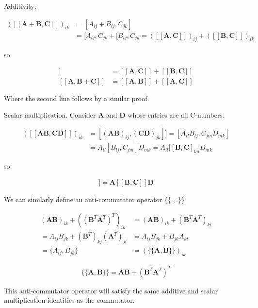 \documentclass[12pt]{article}
\newcommand{\bv}[1]{\boldsymbol{#1}}
\begin{document}
Additivity:

\begin{align}
([[\bv{A}+\bv{B},\bv{C}]])_{ik} &= [A_{ij}+B_{ij},C_{jk}]\\
&= [A_{ij},C_{jk}+[B_{ij},C_{jk} = ([[\bv{A},\bv{C}]])_{ij} + ([[\bv{B},\bv{C}]])_{ik}
\end{align}

so

\begin{align}
[[\bv{A}+\bv{B},\bv{C}]] &= [[\bv{A},\bv{C}]]+[[\bv{B},\bv{C}]]\\
[[\bv{A},\bv{B}+\bv{C}]] &= [[\bv{A},\bv{B}]] + [[\bv{A},\bv{C}]]
\end{align}

Where the second line follows by a similar proof.

Scalar multiplication. Consider $\bv{A}$ and $\bv{D}$ whose entries are all C-numbers.

\begin{align}
([[\bv{A}\bv{B},\bv{C}\bv{D}]])_{ik} &= [(\bv{A}\bv{B})_{ij},(\bv{C}\bv{D})_{jk}]] = [A_{il}B_{lj},C_{jm}D_{mk}]\\
&= A_{il}[B_{lj},C_{jm}]D_{mk}= A_{il}[[\bv{B},\bv{C}]_{lm} D_{mk}
\end{align}

so

\begin{align}
[[\bv{A}\bv{B},\bv{C}\bv{D}]] = \bv{A}[[\bv{B},\bv{C}]]\bv{D}
\end{align}

We can similarly define an anti-commutator operator $\{\{.,.\}\}$

\begin{align}
(\bv{A}\bv{B})_{ik} + ((\bv{B}^T\bv{A}^T)^T)_{ik} &= (\bv{A}\bv{B})_{ik} + (\bv{B}^T\bv{A}^T)_{ki}\\
= A_{ij} B_{jk} + (\bv{B}^T)_{kj}(\bv{A}^T)_{ji} &= A_{ij}B_{jk} + B_{jk} A_{ki}\\
= \{A_{ij},B_{jk}\} &= (\{\{\bv{A},\bv{B}\}\})_{ik}
\end{align}

\begin{align}
\{\{\bv{A},\bv{B}\}\} = \bv{A}\bv{B} + (\bv{B}^T\bv{A}^T)^T
\end{align}

This anti-commutator operator will satisfy the same additive and scalar multiplication identities as the commutator.
\end{document}
